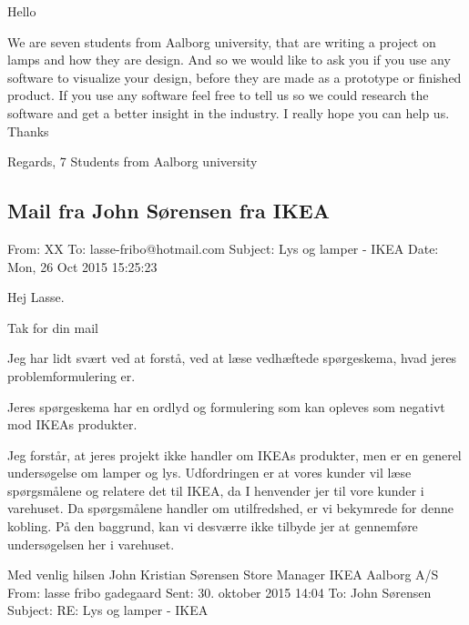   Hello
   
   
  We are seven students from Aalborg university, that are writing a project on lamps and how they are design. And so we would like to ask you if you use any software to visualize your design, before they are made as a prototype or finished product. If you use any software feel free to tell us so we could research the software and get a better insight in the industry. I really hope you can help us. Thanks
   
   
  Regards,
  7 Students from Aalborg university

\subsection{Mail fra John Sørensen fra IKEA}
\label{sec:mailIKEA}
From: XX\newline
To: lasse-fribo@hotmail.com\newline
Subject: Lys og lamper - IKEA\newline
Date: Mon, 26 Oct 2015 15:25:23\newline

Hej Lasse.\newline

Tak for din mail\newline

Jeg har lidt svært ved at forstå, ved at læse vedhæftede spørgeskema, hvad jeres problemformulering er.\newline

Jeres spørgeskema har en ordlyd og formulering som kan opleves som negativt mod IKEAs produkter.\newline

Jeg forstår, at jeres projekt ikke handler om IKEAs produkter, men er en generel undersøgelse om lamper og lys. Udfordringen er at vores kunder vil læse spørgsmålene og relatere det til IKEA, da I henvender jer til vore kunder i varehuset. Da spørgsmålene handler om utilfredshed, er vi bekymrede for denne kobling. På den baggrund, kan vi desværre ikke tilbyde jer at gennemføre undersøgelsen her i varehuset.\newline

Med venlig hilsen\newline
John Kristian Sørensen\newline
Store Manager\newline
IKEA Aalborg A/S\newline
\noindent\makebox[\linewidth]{\rule{\paperwidth}{0.4pt}}
From: lasse fribo gadegaard\newline
Sent: 30. oktober 2015 14:04\newline
To: John Sørensen\newline
Subject: RE: Lys og lamper - IKEA\newline

